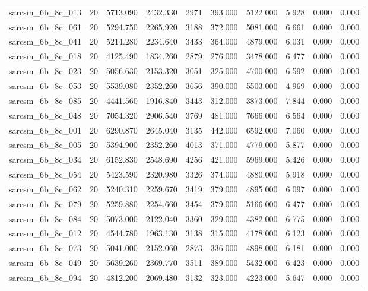 \begin{tabular}{lrrrrrrrrr}
sarcsm\_6b\_8c\_013 & 20 & 5713.090 & 2432.330 & 2971 & 393.000 & 5122.000 & 5.928 & 0.000 & 0.000 \\
sarcsm\_6b\_8c\_061 & 20 & 5294.750 & 2265.920 & 3188 & 372.000 & 5081.000 & 6.661 & 0.000 & 0.000 \\
sarcsm\_6b\_8c\_041 & 20 & 5214.280 & 2234.640 & 3433 & 364.000 & 4879.000 & 6.031 & 0.000 & 0.000 \\
sarcsm\_6b\_8c\_018 & 20 & 4125.490 & 1834.260 & 2879 & 276.000 & 3478.000 & 6.477 & 0.000 & 0.000 \\
sarcsm\_6b\_8c\_023 & 20 & 5056.630 & 2153.320 & 3051 & 325.000 & 4700.000 & 6.592 & 0.000 & 0.000 \\
sarcsm\_6b\_8c\_053 & 20 & 5539.080 & 2352.260 & 3656 & 390.000 & 5503.000 & 4.969 & 0.000 & 0.000 \\
sarcsm\_6b\_8c\_085 & 20 & 4441.560 & 1916.840 & 3443 & 312.000 & 3873.000 & 7.844 & 0.000 & 0.000 \\
sarcsm\_6b\_8c\_048 & 20 & 7054.320 & 2906.540 & 3769 & 481.000 & 7666.000 & 6.564 & 0.000 & 0.000 \\
sarcsm\_6b\_8c\_001 & 20 & 6290.870 & 2645.040 & 3135 & 442.000 & 6592.000 & 7.060 & 0.000 & 0.000 \\
sarcsm\_6b\_8c\_005 & 20 & 5394.900 & 2352.260 & 4013 & 371.000 & 4779.000 & 5.877 & 0.000 & 0.000 \\
sarcsm\_6b\_8c\_034 & 20 & 6152.830 & 2548.690 & 4256 & 421.000 & 5969.000 & 5.426 & 0.000 & 0.000 \\
sarcsm\_6b\_8c\_054 & 20 & 5423.590 & 2320.980 & 3326 & 374.000 & 4880.000 & 5.918 & 0.000 & 0.000 \\
sarcsm\_6b\_8c\_062 & 20 & 5240.310 & 2259.670 & 3419 & 379.000 & 4895.000 & 6.097 & 0.000 & 0.000 \\
sarcsm\_6b\_8c\_079 & 20 & 5259.880 & 2254.660 & 3454 & 379.000 & 5166.000 & 6.477 & 0.000 & 0.000 \\
sarcsm\_6b\_8c\_084 & 20 & 5073.000 & 2122.040 & 3360 & 329.000 & 4382.000 & 6.775 & 0.000 & 0.000 \\
sarcsm\_6b\_8c\_012 & 20 & 4544.780 & 1963.130 & 3138 & 315.000 & 4178.000 & 6.123 & 0.000 & 0.000 \\
sarcsm\_6b\_8c\_073 & 20 & 5041.000 & 2152.060 & 2873 & 336.000 & 4898.000 & 6.181 & 0.000 & 0.000 \\
sarcsm\_6b\_8c\_049 & 20 & 5639.260 & 2369.770 & 3511 & 389.000 & 5432.000 & 6.423 & 0.000 & 0.000 \\
sarcsm\_6b\_8c\_094 & 20 & 4812.200 & 2069.480 & 3132 & 323.000 & 4223.000 & 5.647 & 0.000 & 0.000 \\

\end{tabular}
